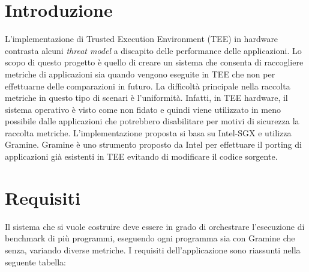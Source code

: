 \documentclass{article}
\begin{document}
\section*{Introduzione}
L'implementazione di Trusted Execution Environment (TEE) in hardware contrasta alcuni \textit{threat model} a discapito delle performance delle applicazioni. Lo scopo di questo progetto è quello di creare un sistema che consenta di raccogliere metriche di applicazioni sia quando vengono eseguite in TEE che non per effettuarne delle comparazioni in futuro. La difficoltà principale nella raccolta metriche in questo tipo di scenari è l'uniformità. Infatti, in TEE hardware, il sistema operativo è visto come non fidato e quindi viene utilizzato in meno possibile dalle applicazioni che potrebbero disabilitare per motivi di sicurezza la raccolta metriche.
L'implementazione proposta si basa su Intel-SGX e utilizza Gramine. Gramine è uno strumento proposto da Intel per effettuare il porting di applicazioni già esistenti in TEE evitando di modificare il codice sorgente.

\clearpage
\section{Requisiti}\label{sec:requirements}
Il sistema che si vuole costruire deve essere in grado di orchestrare l'esecuzione di benchmark di più programmi, eseguendo ogni programma sia con Gramine che senza, variando diverse metriche. I requisiti dell'applicazione sono riassunti nella seguente tabella:
\end{document}
